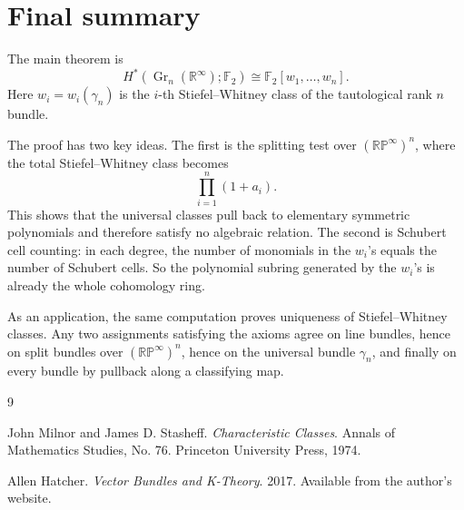 \documentclass[11pt]{article}
\theoremstyle{remark}
\newcommand{\F}{\mathbb F}
\newcommand{\R}{\mathbb R}
\newcommand{\RP}{\mathbb{RP}}
\newcommand{\Gr}{\operatorname{Gr}}
\newcommand{\gamman}{\gamma_n}
\begin{document}
\section{Final summary}

The main theorem is
\[
  H^*(\Gr_n(\R^\infty);\F_2)
  \cong
  \F_2[w_1,\dots,w_n].
\]
Here $w_i=w_i(\gamman)$ is the $i$-th Stiefel--Whitney class of the tautological rank $n$ bundle.

The proof has two key ideas.  The first is the splitting test over $(\RP^\infty)^n$, where the total Stiefel--Whitney class becomes
\[
  \prod_{i=1}^n(1+a_i).
\]
This shows that the universal classes pull back to elementary symmetric polynomials and therefore satisfy no algebraic relation.  The second is Schubert cell counting: in each degree, the number of monomials in the $w_i$'s equals the number of Schubert cells.  So the polynomial subring generated by the $w_i$'s is already the whole cohomology ring.

As an application, the same computation proves uniqueness of Stiefel--Whitney classes.  Any two assignments satisfying the axioms agree on line bundles, hence on split bundles over $(\RP^\infty)^n$, hence on the universal bundle $\gamman$, and finally on every bundle by pullback along a classifying map.

\begin{thebibliography}{9}

John Milnor and James D. Stasheff.
\textit{Characteristic Classes}.
Annals of Mathematics Studies, No. 76. Princeton University Press, 1974.

Allen Hatcher.
\textit{Vector Bundles and K-Theory}.
2017. Available from the author's website.

\end{thebibliography}
\end{document}
